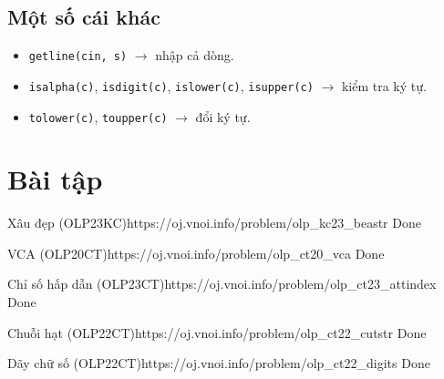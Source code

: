 \subsection{Một số cái khác}
\begin{itemize}
    \item \texttt{getline(cin, s)} $\to$ nhập cả dòng.
    \item \texttt{isalpha(c)}, \texttt{isdigit(c)}, \texttt{islower(c)}, \texttt{isupper(c)} $\to$ kiểm tra ký tự.
    \item \texttt{tolower(c)}, \texttt{toupper(c)} $\to$ đổi ký tự.
\end{itemize}

\section{Bài tập}

\begin{baitap}{Xâu đẹp (OLP23KC)}{https://oj.vnoi.info/problem/olp\_kc23\_beastr}
    Done
\end{baitap}



\begin{baitap}{VCA (OLP20CT)}{https://oj.vnoi.info/problem/olp\_ct20\_vca}
    Done
\end{baitap}


\begin{baitap}{Chỉ số hấp dẫn (OLP23CT)}{https://oj.vnoi.info/problem/olp\_ct23\_attindex}
    Done
\end{baitap}

\begin{baitap}{Chuỗi hạt (OLP22CT)}{https://oj.vnoi.info/problem/olp\_ct22\_cutstr}
    Done    
\end{baitap}

\begin{baitap}{Dãy chữ số (OLP22CT)}{https://oj.vnoi.info/problem/olp\_ct22\_digits}
    Done
\end{baitap}